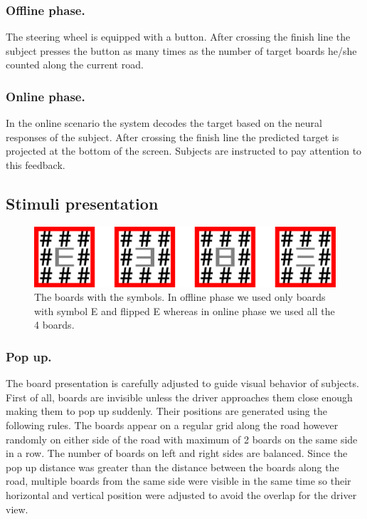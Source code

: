 \documentclass[12pt]{iopart}
\begin{document}
\subsubsection*{Offline phase.}
The steering wheel is equipped with a button.
After crossing the finish line the subject presses the button as many times
as the number of target boards he/she counted along the current road.

\subsubsection*{Online phase.}
In the online scenario the system decodes the target based
on the neural responses of the subject. 
After crossing the finish line the predicted target is projected
at the bottom of the screen. Subjects are instructed to pay
attention to this feedback.


\subsection{Stimuli presentation}

\begin{figure}[!t]
    \includegraphics[trim={0cm 0cm 0cm 0cm},clip,width=0.80\columnwidth]{../images/Stimuli.png}
    \caption{The boards with the symbols. In offline phase we used only boards 
        with symbol E and flipped E whereas in online phase we used all the 4 boards.}
\label{fig:boards}
\end{figure}

\subsubsection{Pop up.} The board presentation is carefully adjusted to guide visual behavior of subjects.
First of all, boards are invisible unless the driver approaches them
close enough making them to pop up suddenly.
Their positions are generated using the following rules.
The boards appear on a regular grid along the road however
randomly on either side of the road with maximum of 2 boards
on the same side in a row. The number of boards on left
and right sides are balanced. Since the pop up distance was greater
than the distance between the boards along the road, multiple
boards from the same side were visible in the same time
so their horizontal and vertical position were adjusted to avoid
the overlap for the driver view.
\end{document}
